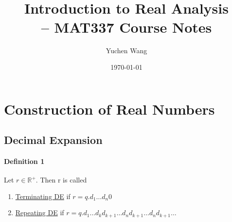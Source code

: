 \documentclass[11pt]{article}
\title{Introduction to Real Analysis \\ -- MAT337 Course Notes}
\author{Yuchen Wang}
\date{\today}
\newcommand{\real}[0]{\mathbb{R}}
\newcommand{\under}[1]{\underline{#1}}
\begin{document}
    \maketitle
    \tableofcontents
    \newpage
\section{Construction of Real Numbers}
\subsection{Decimal Expansion}
\paragraph{Definition 1}
Let $r \in \real^{+}$. Then r is called
\begin{enumerate}
	\item \under{Terminating DE} if $r = q.d_1\hdots d_n 0$
	\item \under{Repeating DE} if $r = q.d_1\hdots d_k d_{k+1}\hdots d_nd_{k+1}\hdots d_nd_{k+1}\hdots$
\end{enumerate}
\end{document}
